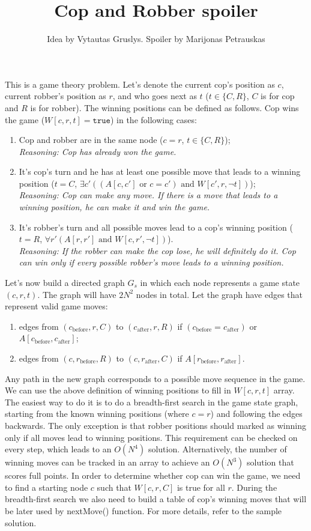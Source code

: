 \documentclass[a4paper,12pt]{article}
\title{Cop and Robber spoiler}
\date{}
\author{Idea by Vytautas Gruslys. Spoiler by Marijonas Petrauskas}
\begin{document}
\maketitle

\noindent This is a game theory problem. Let's denote the current cop's position as $c$, current robber's position as $r$, and who goes next as $t$ ($t \in \{C, R\}$, $C$ is for cop and $R$ is for robber). The winning positions can be defined as follows. Cop wins the game ($W[c, r, t] = \texttt{true}$) in the following cases:
\begin{enumerate}
\item Cop and robber are in the same node ($c = r$, $t \in \{C, R\}$);
	\\ \textit{Reasoning: Cop has already won the game.}
\item It's cop's turn and he has at least one possible move that leads to a winning position ($t = C$, $\exists c' ((A[c, c'] \text{ or } c = c') \text{ and } W[c', r, \neg t])$);
	\\ \textit{Reasoning: Cop can make any move. If there is a move that leads to a winning position, he can make it and win the game.}
\item It's robber's turn and all possible moves lead to a cop's winning position ($t = R$, $\forall r' (A[r, r'] \text{ and } W[c, r', \neg t])$).
	\\ \textit{Reasoning: If the robber can make the cop lose, he will definitely do it. Cop can win only if every possible robber's move leads to a winning position.}
\end{enumerate}
Let's now build a directed graph $G_s$ in which each node represents a game state $(c, r, t)$. The graph will have $2N^2$ nodes in total. Let the graph have edges that represent valid game moves:
\begin{enumerate}
\item edges from $(c_\text{before}, r, C)$ to $(c_\text{after}, r, R)$ if $(c_\text{before} = c_\text{after})$ or $A[c_\text{before}, c_\text{after}]$;
\item edges from $(c, r_\text{before}, R)$ to $(c, r_\text{after}, C)$ if $A[r_\text{before}, r_\text{after}]$.
\end{enumerate}
Any path in the new graph corresponds to a possible move sequence in the game. We can use the above definition of winning positions to fill in $W[c, r, t]$ array. The easiest way to do it is to do a breadth-first search in the game state graph, starting from the known winning positions (where $c=r$) and following the edges backwards. The only exception is that robber positions should marked as winning only if all moves lead to winning positions. This requirement can be checked on every step, which leads to an $O(N^4)$ solution. Alternatively, the number of winning moves can be tracked in an array to achieve an $O(N^3)$ solution that scores full points. In order to determine whether cop can win the game, we need to find a starting node $c$ such that $W[c, r, C]$ is true for all $r$. During the breadth-first search we also need to build a table of cop's winning moves that will be later used by nextMove() function. For more details, refer to the sample solution.
\end{document}
